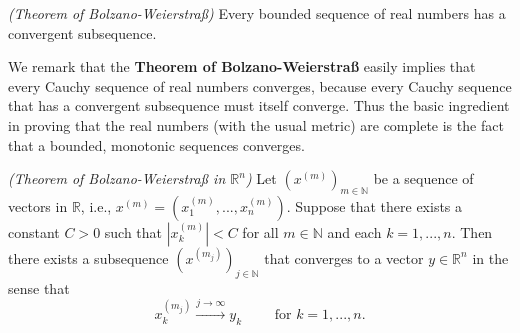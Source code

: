 \documentclass[10pt]{article}
\newcommand{\R}{\mathbb{R}}
\newcommand{\N}{\mathbb{N}}
\begin{document}
  \begin{theorem}
    \textit{(Theorem of Bolzano-Weierstra\ss)} 
    Every bounded sequence of real numbers has a convergent subsequence.
  \end{theorem}
  
  We remark that the \textbf{Theorem of Bolzano-Weierstra\ss} easily implies that every Cauchy sequence of real numbers converges, because every Cauchy sequence that has a convergent subsequence must itself converge. Thus the basic ingredient in proving that the real numbers (with the usual metric) are complete is the fact that a bounded, monotonic sequences converges.

  \begin{theorem}
    \textit{(Theorem of Bolzano-Weierstra{\ss} in $\R^{n}$)}
    Let $\left(x^{(m)}\right)_{m \in \N}$ be a sequence of vectors in $\R$, i.e., 
    $x^{(m)} = \left(x_{1}^{(m)},...,x_{n}^{(m)}\right)$.
    Suppose that there exists a constant $C>0$ such that $|x_{k}^{(m)}|<C$ for all $m \in \N$ and each $k = 1,...,n$.
    Then there exists a subsequence $\left(x^{(m_{j})}\right)_{j \in \N}$ that converges to a vector $y \in \R^{n}$ in the sense that 
    \[
      x_{k}^{(m_{j})}\xrightarrow[]{j \rightarrow \infty}y_{k}
      \qquad
      \text{ for }k=1,...,n.  
    \]
  \end{theorem}
\end{document}
